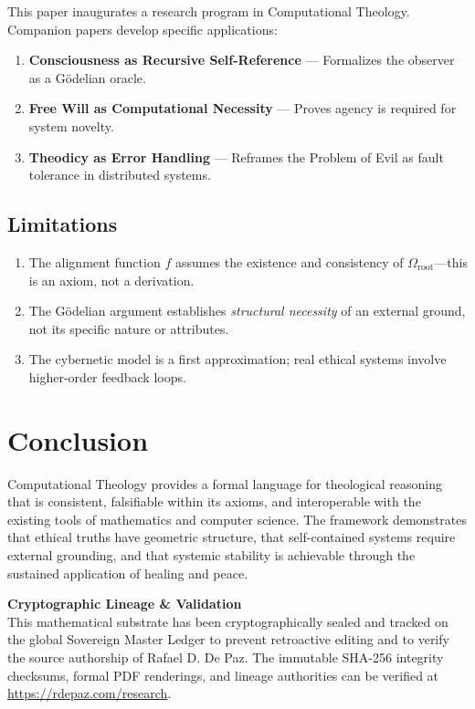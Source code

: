 \documentclass[12pt, a4paper]{article}
\theoremstyle{plain}
\theoremstyle{definition}
\theoremstyle{remark}
\begin{document}
This paper inaugurates a research program in Computational Theology. Companion
papers develop specific applications:
\begin{enumerate}
  \item \textbf{Consciousness as Recursive Self-Reference} --- Formalizes
    the observer as a G\"odelian oracle.
  \item \textbf{Free Will as Computational Necessity} --- Proves agency
    is required for system novelty.
  \item \textbf{Theodicy as Error Handling} --- Reframes the Problem of
    Evil as fault tolerance in distributed systems.
\end{enumerate}

\subsection{Limitations}
\begin{enumerate}
  \item The alignment function $f$ assumes the existence and consistency
    of $\Omega_{\text{root}}$---this is an axiom, not a derivation.
  \item The G\"odelian argument establishes \emph{structural necessity}
    of an external ground, not its specific nature or attributes.
  \item The cybernetic model is a first approximation; real ethical
    systems involve higher-order feedback loops.
\end{enumerate}

\section{Conclusion}\label{sec:conclusion}

Computational Theology provides a formal language for theological reasoning
that is consistent, falsifiable within its axioms, and interoperable with
the existing tools of mathematics and computer science. The framework
demonstrates that ethical truths have geometric structure, that self-contained
systems require external grounding, and that systemic stability is achievable
through the sustained application of healing and peace.


\vspace{2em}
\noindent\hrulefill
\vspace{1em}

\noindent\textbf{Cryptographic Lineage \& Validation}\\
This mathematical substrate has been cryptographically sealed and tracked on the global Sovereign Master Ledger to prevent retroactive editing and to verify the source authorship of Rafael D. De Paz. The immutable SHA-256 integrity checksums, formal PDF renderings, and lineage authorities can be verified at \url{https://rdepaz.com/research}.



\end{document}
